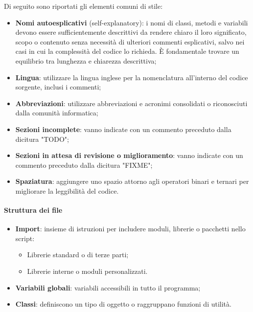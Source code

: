 \label{sec:elementi-comuni-stile}
\par Di seguito sono riportati gli elementi comuni di stile:
\begin{itemize}
  \item \textbf{Nomi autoesplicativi} (self-explanatory): i nomi di classi, metodi e variabili devono essere sufficientemente descrittivi da rendere chiaro il loro significato, scopo o contenuto senza necessità di ulteriori commenti esplicativi, salvo nei casi in cui la complessità del codice lo richieda. È fondamentale trovare un equilibrio tra lunghezza e chiarezza descrittiva;
  \item \textbf{Lingua}: utilizzare la lingua inglese per la nomenclatura all'interno del codice sorgente, inclusi i commenti;
  \item \textbf{Abbreviazioni}: utilizzare abbreviazioni e acronimi consolidati o riconosciuti dalla comunità informatica;
  \item \textbf{Sezioni incomplete}: vanno indicate con un commento preceduto dalla dicitura "TODO";
  \item \textbf{Sezioni in attesa di revisione o miglioramento}: vanno indicate con un commento preceduto dalla dicitura "FIXME";
  \item \textbf{Spaziatura}: aggiungere uno spazio attorno agli operatori binari e ternari per migliorare la leggibilità del codice.
\end{itemize}

\paragraph*{Struttura dei file}
\begin{itemize}
  \item \textbf{Import}: insieme di istruzioni per includere moduli, librerie o pacchetti nello script:
  \begin{itemize}
    \item Librerie standard o di terze parti;
    \item Librerie interne o moduli personalizzati.
  \end{itemize}
  \item \textbf{Variabili globali}: variabili accessibili in tutto il programma;
  \item \textbf{Classi}: definiscono un tipo di oggetto o raggruppano funzioni di utilità.
\end{itemize}

